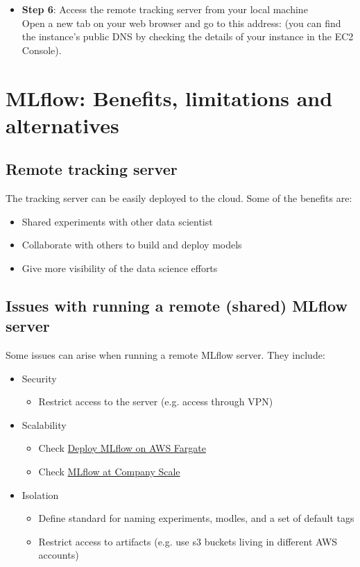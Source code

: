 \documentclass[letterpaper,12pt,notitlepage,twoside]{report}
\begin{document}
\begin{itemize}
\item \textbf{Step 6}: Access the remote tracking server from your local machine \\
Open a new tab on your web browser and go to this address:  (you can find the instance's public DNS by checking the details of your instance in the EC2 Console).
\end{itemize}

\section{MLflow: Benefits, limitations and alternatives}
\subsection{Remote tracking server}
The tracking server can be easily deployed to the cloud. Some of the benefits are:
\begin{itemize}[noitemsep, topsep=0pt]
\item Shared experiments with other data scientist
\item Collaborate with others to build and deploy models
\item Give more visibility of the data science efforts
\end{itemize}

\subsection{Issues with running a remote (shared) MLflow server}
Some issues can arise when running a remote MLflow server. They include:
\begin{itemize}[noitemsep, topsep=0pt]
\item Security
	\begin{itemize}[label={}]
	\item Restrict access to the server (e.g. access through VPN)
	\end{itemize}
\item Scalability
	\begin{itemize}[label={}]
	\item Check \href{https://aws.amazon.com/blogs/machine-learning/managing-your-machine-learning-lifecycle-with-mlflow-and-amazon-sagemaker/}{Deploy MLflow on AWS Fargate}
	\item Check \href{https://www.slideshare.net/databricks/mlflow-at-company-scale-239587085}{MLflow at Company Scale}
	\end{itemize}
\item Isolation
	\begin{itemize}[label={}]
	\item Define standard for naming experiments, modles, and a set of default tags
	\item Restrict access to artifacts (e.g. use s3 buckets living in different AWS accounts)
	\end{itemize}
\end{itemize}
\end{document}
